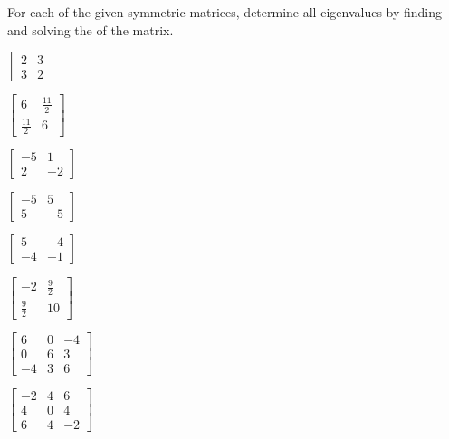 \begin{exercise}  
For each of the given symmetric matrices, determine all eigenvalues by finding and solving the  of the matrix.
\begin{Parts}
\item \(\begin{bmatrix} 2&3\\3&2 \end{bmatrix}\)
\item \(\begin{bmatrix} 6&\frac{11}2\\\frac{11}2&6 \end{bmatrix}\)
\item \(\begin{bmatrix} -5&1\\2&-2 \end{bmatrix}\)
\item \(\begin{bmatrix} -5&5\\5&-5 \end{bmatrix}\)

\begin{OmitV1}
\item \(\begin{bmatrix} 5&-4\\-4&-1 \end{bmatrix}\)
\item \(\begin{bmatrix} -2&\frac92\\\frac92&10 \end{bmatrix}\)
\item \(\begin{bmatrix}6&0&-4
\\0&6&3
\\-4&3&6
 \end{bmatrix}\)
\item \(\begin{bmatrix}-2&4&6
\\4&0&4
\\6&4&-2
 \end{bmatrix}\)
\end{OmitV1}


\end{Parts}
\end{exercise}
